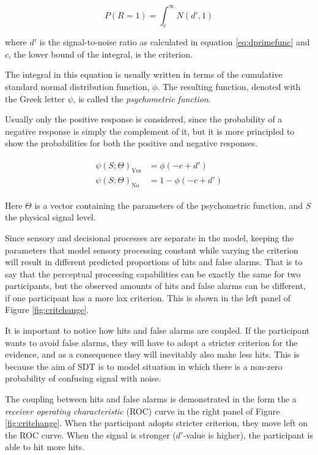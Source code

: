 \documentclass{article}\usepackage{knitr}
\begin{document}
\begin{equation}
\label{eq:SDTintegral}
P(R = 1) = \int_{c}^{\infty} N(d', 1)
\end{equation}

where $d'$ is the signal-to-noise ratio as calculated in equation \ref{eq:dprimefunc} and $c$, the lower bound of the integral, is the criterion. 

The integral in this equation is usually written in terms of the cumulative standard normal distribution function, $\phi$. The resulting function, denoted with the Greek letter $\psi$, is called the \textit{psychometric function}. \cite[Chapter 4]{kingdomprins2010}

Usually only the positive response is considered, since the probability of a negative response is simply the complement of it, but it is more principled to show the probabilities for both the positive and negative responses. 

\begin{align*}
\begin{split}
\psi(S; \Theta)_{\text{Yes}} &= \phi(-c + d') \\
\psi(S; \Theta)_{\text{No}} &=  1 - \phi(-c + d')
\end{split}
\end{align*}

Here $\Theta$ is a vector containing the parameters of the psychometric function, and $S$ the physical signal level.

Since sensory and decisional processes are separate in the model, keeping the parameters that model sensory processing constant while varying the criterion will result in different predicted proportions of hits and false alarms. That is to say that the perceptual processing capabilities can be exactly the same for two participants, but the observed amounts of hits and false alarms can be different, if one participant has a more lax criterion. This is shown in the left panel of Figure \ref{fig:critchange}.

It is important to notice how hits and false alarms are coupled. If the participant wants to avoid false alarms, they will have to adopt a stricter criterion for the evidence, and  as a consequence they  will inevitably also make less hits. This is because the aim of SDT is to model situation in which there is a non-zero probability of confusing signal with noise. 

The coupling between hits and false alarms is demonstrated in the form the a \textit{receiver operating characteristic} (ROC) curve \cite[161]{kingdomprins2010} in the right panel of Figure \ref{fig:critchange}. When the participant adopts stricter criterion, they move left on the ROC curve. When the signal is stronger ($d'$-value is higher), the participant is able to hit more hits. 
\end{document}
